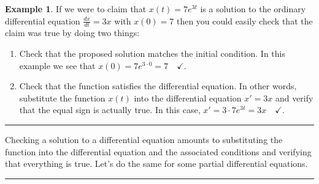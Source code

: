 \documentclass[
]{book}
\providecommand{\tightlist}{%
  \setlength{\itemsep}{0pt}\setlength{\parskip}{0pt}}
\theoremstyle{definition}
\theoremstyle{definition}
\newtheorem{example}{Example}[chapter]
\theoremstyle{definition}
\theoremstyle{remark}
\begin{document}
\begin{example}
\protect\hypertarget{exm:unnamed-chunk-510}{}{\label{exm:unnamed-chunk-510} }If we were to claim that \(x(t) = 7e^{3t}\) is a solution to the ordinary differential equation \(\frac{dx}{dt} = 3x\) with \(x(0) = 7\) then you could easily check that the claim was true by doing two things:

\begin{enumerate}
\def\labelenumi{\arabic{enumi}.}
\tightlist
\item
  Check that the proposed solution matches the initial condition. In this example we see that \(x(0) = 7e^{3 \cdot 0} = 7 \quad \checkmark.\)
\item
  Check that the function satisfies the differential equation. In other words, substitute the function \(x(t)\) into the differential equation \(x' = 3x\) and verify that the equal sign is actually true. In this case, \(x' = 3\cdot 7e^{3t} = 3 x \quad \checkmark .\)
\end{enumerate}
\end{example}

\begin{center}\rule{0.5\linewidth}{0.5pt}\end{center}

Checking a solution to a differential equation amounts to substituting the function into the differential equation and the associated conditions and verifying that everything is true. Let's do the same for some partial differential equations.

\begin{center}\rule{0.5\linewidth}{0.5pt}\end{center}
\end{document}
